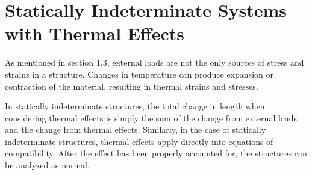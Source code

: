 \documentclass[
10pt,
a4paper,
openany,
svgnames,
]{kaobook} %
\begin{document}
\section{Statically Indeterminate Systems with Thermal Effects}

As mentioned in section 1.3, external loads are not the only sources of stress and strains in a structure. Changes in temperature can produce expansion or contraction of the material, resulting in thermal strains and stresses.

In statically indeterminate structures, the total change in length when considering thermal effects is simply the sum of the change from external loads and the change from thermal effects. Similarly, in the case of statically indeterminate structures, thermal effects apply directly into equations of compatibility. After the effect has been properly accounted for, the structures can be analyzed as normal.
\end{document}
